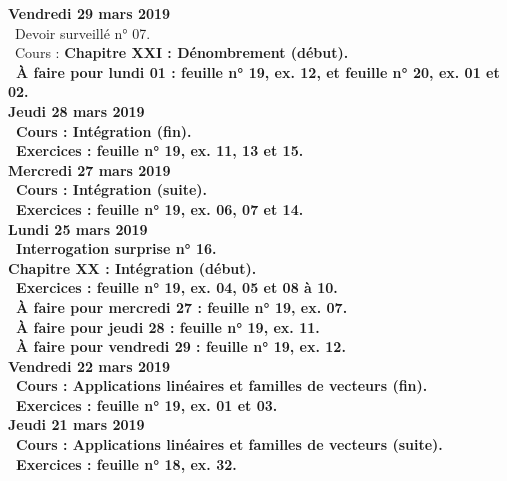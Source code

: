 \documentclass[12pt,a4paper]{article}
\begin{document}
\noindent\textbf{\bf Vendredi 29 mars 2019} \\
\bu\ Devoir surveillé n° 07.\\
\bu\ Cours : \bf Chapitre XXI \rm : Dénombrement (début).\\
\bu\ À faire pour lundi 01 : feuille n° 19, ex. 12, et feuille n° 20, ex. 01 et 02.\vspace{.4cm}\\

\noindent\textbf{Jeudi 28 mars 2019}\\
\bu\ Cours : Intégration (fin).\\
\bu\ Exercices : feuille n° 19, ex. 11, 13 et 15.\vspace{.4cm}\\

\noindent\textbf{Mercredi 27 mars 2019} \\
\bu\ Cours : Intégration (suite).\\
\bu\ Exercices : feuille n° 19, ex. 06, 07 et 14.\vspace{.4cm}\\

\noindent\textbf{\bf Lundi 25 mars 2019} \\
\bu\ Interrogation surprise n° 16.\\
\bf Chapitre XX \rm : Intégration (début).\vspace{.4cm}\\
\bu\ Exercices : feuille n° 19, ex. 04, 05 et 08 à 10.\\
\bu\ À faire pour mercredi 27 : feuille n° 19, ex. 07.\\
\bu\ À faire pour jeudi 28 : feuille n° 19, ex. 11.\\
\bu\ À faire pour vendredi 29 : feuille n° 19, ex. 12.\vspace{.4cm}\\

\noindent\textbf{\bf Vendredi 22 mars 2019} \\
\bu\ Cours : Applications linéaires et familles de vecteurs (fin).\\
\bu\ Exercices : feuille n° 19, ex. 01 et 03.\vspace{.4cm}\\

\noindent\textbf{Jeudi 21 mars 2019}\\
\bu\ Cours : Applications linéaires et familles de vecteurs (suite).\\
\bu\ Exercices : feuille n° 18, ex. 32.\vspace{.4cm}\\
\end{document}
